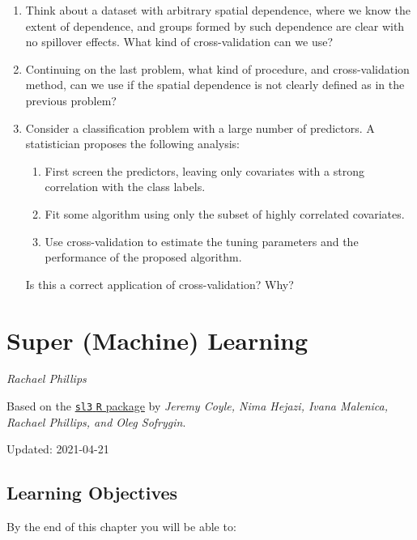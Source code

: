 \documentclass[12pt, krantz2,]{krantz}
\providecommand{\tightlist}{%
  \setlength{\itemsep}{0pt}\setlength{\parskip}{0pt}}
\theoremstyle{definition}
\theoremstyle{definition}
\theoremstyle{definition}
\newcommand{\1}{\mathbbm{1}}
\begin{document}
\begin{enumerate}
\def\labelenumi{\arabic{enumi}.}
\item
  Think about a dataset with arbitrary spatial dependence, where we know
  the extent of dependence, and groups formed by such dependence are clear
  with no spillover effects. What kind of cross-validation can we use?
\item
  Continuing on the last problem, what kind of procedure, and cross-validation
  method, can we use if the spatial dependence is not clearly defined as in the
  previous problem?
\item
  Consider a classification problem with a large number of predictors. A
  statistician proposes the following analysis:

  \begin{enumerate}
  \def\labelenumii{\alph{enumii}.}
  \tightlist
  \item
    First screen the predictors, leaving only covariates with a strong
    correlation with the class labels.
  \item
    Fit some algorithm using only the subset of highly correlated covariates.
  \item
    Use cross-validation to estimate the tuning parameters and the performance
    of the proposed algorithm.
  \end{enumerate}

  Is this a correct application of cross-validation? Why?
\end{enumerate}

\hypertarget{sl3}{%
\section{Super (Machine) Learning}\label{sl3}}

\emph{Rachael Phillips}

Based on the \href{https://github.com/tlverse/sl3}{\texttt{sl3} \texttt{R} package} by \emph{Jeremy
Coyle, Nima Hejazi, Ivana Malenica, Rachael Phillips, and Oleg Sofrygin}.

Updated: 2021-04-21

\hypertarget{learning-objectives-3}{%
\subsection*{Learning Objectives}\label{learning-objectives-3}}


By the end of this chapter you will be able to:
\end{document}
